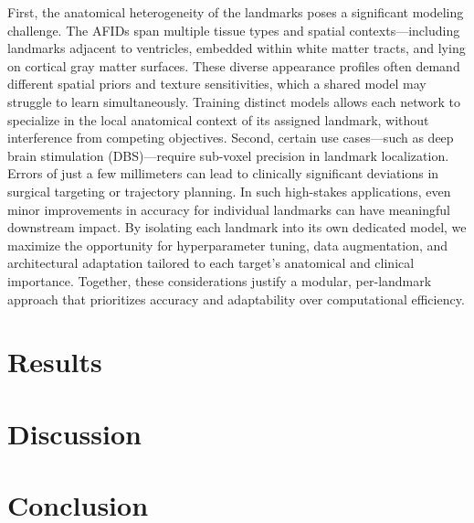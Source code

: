 First, the anatomical heterogeneity of the landmarks poses a significant modeling challenge. The AFIDs span multiple tissue types and spatial contexts—including landmarks adjacent to ventricles, embedded within white matter tracts, and lying on cortical gray matter surfaces. These diverse appearance profiles often demand different spatial priors and texture sensitivities, which a shared model may struggle to learn simultaneously. Training distinct models allows each network to specialize in the local anatomical context of its assigned landmark, without interference from competing objectives. Second, certain use cases—such as deep brain stimulation (DBS)—require sub-voxel precision in landmark localization. Errors of just a few millimeters can lead to clinically significant deviations in surgical targeting or trajectory planning. In such high-stakes applications, even minor improvements in accuracy for individual landmarks can have meaningful downstream impact. By isolating each landmark into its own dedicated model, we maximize the opportunity for hyperparameter tuning, data augmentation, and architectural adaptation tailored to each target's anatomical and clinical importance. Together, these considerations justify a modular, per-landmark approach that prioritizes accuracy and adaptability over computational efficiency.




\section{Results}
\section{Discussion}
\section{Conclusion}



